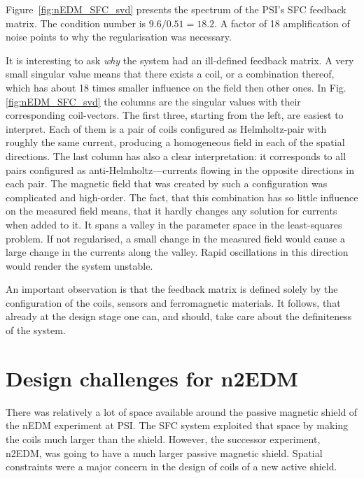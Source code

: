 Figure~\ref{fig:nEDM_SFC_svd} presents the spectrum of the PSI's SFC feedback matrix. The condition number is $9.6 / 0.51 = 18.2$. A factor of 18 amplification of noise points to why the regularisation was necessary.

It is interesting to ask \emph{why} the system had an ill-defined feedback matrix. A very small singular value means that there exists a coil, or a combination thereof, which has about 18 times smaller influence on the field then other ones. In Fig.\,\ref{fig:nEDM_SFC_svd} the columns are the singular values with their corresponding coil-vectors. The first three, starting from the left, are easiest to interpret. Each of them is a pair of coils configured as Helmholtz-pair with roughly the same current, producing a homogeneous field in each of the spatial directions.
The last column has also a clear interpretation: it corresponds to all pairs configured as anti-Helmholtz---currents flowing in the opposite directions in each pair. The magnetic field that was created by such a configuration was complicated and high-order. The fact, that this combination has so little influence on the measured field means, that it hardly changes any solution for currents when added to it. It spans a valley in the parameter space in the least-squares problem. If not regularised, a small change in the measured field would cause a large change in the currents along the valley. Rapid oscillations in this direction would render the system unstable.

An important observation is that the feedback matrix is defined solely by the configuration of the coils, sensors and ferromagnetic materials. It follows, that already at the design stage one can, and should, take care about the definiteness of the system.





\section{Design challenges for n2EDM}
\label{sec:n2EDM_challenges}
There was relatively a lot of space available around the passive magnetic shield of the nEDM experiment at PSI\@. The SFC system exploited that space by making the coils much larger than the shield. However, the successor experiment, n2EDM, was going to have a much larger passive magnetic shield. Spatial constraints were a major concern in the design of coils of a new active shield.

